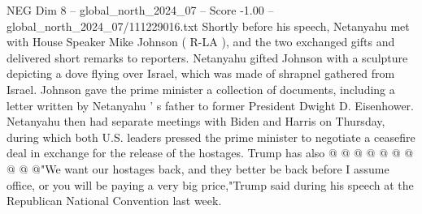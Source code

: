 \begin{textsample}{NEG Dim 8 – global\_north\_2024\_07 – Score -1.00 – global\_north\_2024\_07/111229016.txt}
Shortly before his speech, Netanyahu met with House Speaker Mike Johnson ( R-LA ), and the two exchanged gifts and delivered short remarks to reporters.
Netanyahu gifted Johnson with a sculpture depicting a dove flying over Israel, which was made of shrapnel gathered from Israel.
Johnson gave the prime minister a collection of documents, including a letter written by Netanyahu ' s father to former President Dwight D.
Eisenhower.
Netanyahu then had separate meetings with Biden and Harris on Thursday, during which both U.S. leaders pressed the prime minister to negotiate a ceasefire deal in exchange for the release of the hostages.
Trump has also @ @ @ @ @ @ @ @ @ @"We want our hostages back, and they better be back before I assume office, or you will be paying a very big price,"Trump said during his speech at the Republican National Convention last week.

\end{textsample}
